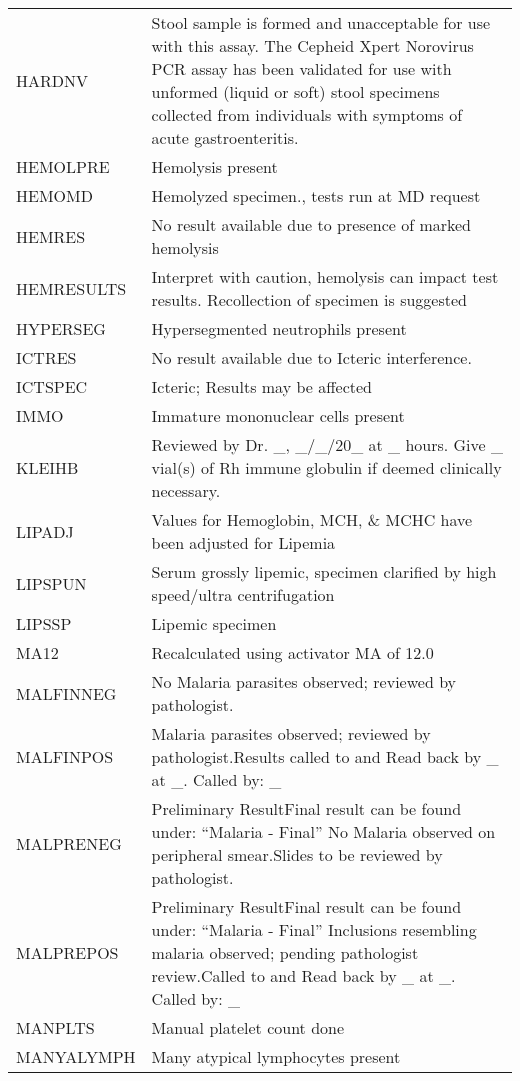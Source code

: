 \begin{fullwidth}
\begin{longtable}{p{.20\linewidth} p{.75\linewidth}}
HARDNV       & Stool sample is formed and unacceptable for use with this assay. The Cepheid Xpert Norovirus PCR assay has been validated for use with unformed (liquid or soft) stool specimens collected from individuals with symptoms of acute gastroenteritis.\\
HEMOLPRE     & Hemolysis present\\
HEMOMD       & Hemolyzed specimen., tests run at MD request\\
HEMRES       & No result available due to presence of marked hemolysis\\
HEMRESULTS   & Interpret with caution, hemolysis can impact test results. Recollection of specimen is suggested\\
HYPERSEG     & Hypersegmented neutrophils present\\
ICTRES       & No result available due to Icteric interference.\\
ICTSPEC      & Icteric; Results may be affected\\
IMMO         & Immature mononuclear cells present\\
KLEIHB       & Reviewed by Dr. \_, \_/\_/20\_ at \_ hours. Give \_ vial(s) of Rh immune globulin if deemed clinically necessary.\\
LIPADJ       & Values for Hemoglobin, MCH, \& MCHC have been adjusted for Lipemia\\
LIPSPUN      & Serum grossly lipemic, specimen clarified by high speed/ultra centrifugation\\
LIPSSP       & Lipemic specimen\\
MA12         & Recalculated using activator MA of 12.0\\
MALFINNEG    & No Malaria parasites observed; reviewed by pathologist.\\
MALFINPOS    & Malaria parasites observed; reviewed by pathologist.Results called to and Read back by \_ at \_. Called by: \_\\
MALPRENEG    & Preliminary ResultFinal result can be found under: ``Malaria - Final'' No Malaria observed on peripheral smear.Slides to be reviewed by pathologist.\\
MALPREPOS    & Preliminary ResultFinal result can be found under: ``Malaria - Final'' Inclusions resembling malaria observed; pending pathologist review.Called to and Read back by \_ at \_. Called by: \_\\
MANPLTS      & Manual platelet count done\\
MANYALYMPH   & Many atypical lymphocytes present\\

\end{longtable}
\end{fullwidth}
